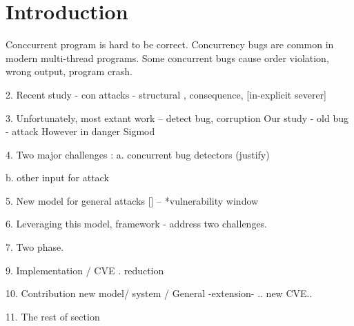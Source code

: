 \section{Introduction} \label{sec:intro}


Conccurrent program is hard to be correct. 
Concurrency bugs are common in modern multi-thread programs. 
Some concurrent bugs cause order violation, wrong output, program crash. 

2. Recent study - con attacks - structural , consequence, [in-explicit severer]


3. Unfortunately, most extant work -- detect bug, corruption 
   Our study - old bug - attack
   However in danger
   Sigmod 

4. Two major challenges : 
a. concurrent bug detectors (justify) 

b. other input for attack


5. New model for general attacks [] -- *vulnerability window 


6. Leveraging this model, framework - address two challenges.

7. Two phase. 

9. Implementation / CVE . reduction

10. Contribution
     new model/ system / General -extension- .. new CVE..

11. The rest of section





